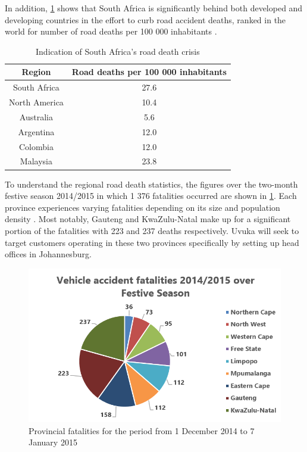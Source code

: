 In addition, \cref{tab:deaths100thousand} shows that South Africa is significantly behind both developed and developing countries in the effort to curb road accident deaths, ranked  in the world for number of road deaths per 100 000 inhabitants \cite{deathsPer100thousandStats}.


\begin{table}[htbp]
  \centering
  \caption{Indication of South Africa's road death crisis}
    \begin{tabular}{cc}
    \toprule
    \textbf{Region} & \textbf{Road deaths per 100 000 inhabitants} \\
    \midrule
    South Africa & 27.6 \\
    North America & 10.4 \\
    Australia & 5.6 \\
    Argentina & 12.0 \\
    Colombia & 12.0 \\
    Malaysia & 23.8 \\
    \bottomrule
    \end{tabular}%
  \label{tab:deaths100thousand}%
\end{table}%

To understand the regional road death statistics, the figures over the two-month festive season 2014/2015 in which 1 376 fatalities occurred are shown in \cref{fig:festiveSeason}. Each province experiences varying fatalities depending on its size and population density \cite{ProvincialFestiveStats}. Most notably, Gauteng and KwaZulu-Natal make up for a significant portion of the fatalities with 223 and 237 deaths respectively. Uvuka will seek to target customers operating in these two provinces specifically by setting up head offices in Johannesburg.

\begin{figure}[H]
\centering
\includegraphics[width=1\textwidth]{images/provincial_fatalities.PNG}
\vskip10pt
\caption[Provincial fatalities for the period from 1 December 2014 to 7 January 2015]{Provincial fatalities for the period from 1 December 2014 to 7 January 2015}
\label{fig:festiveSeason}
\end{figure}

